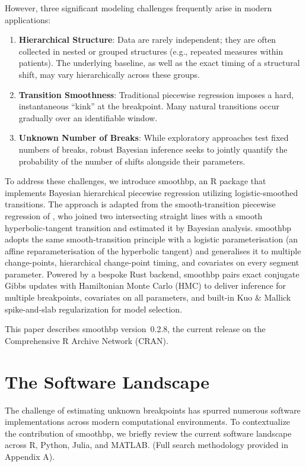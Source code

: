 \documentclass[12pt]{article}
\newcommand{\pkg}[1]{\textsf{#1}}
\begin{document}
However, three significant modeling challenges frequently arise in modern applications:
\begin{enumerate}
    \item \textbf{Hierarchical Structure}: Data are rarely independent; they are often collected in nested or grouped structures (e.g., repeated measures within patients). The underlying baseline, as well as the exact timing of a structural shift, may vary hierarchically across these groups.
    \item \textbf{Transition Smoothness}: Traditional piecewise regression imposes a hard, instantaneous ``kink'' at the breakpoint. Many natural transitions occur gradually over an identifiable window.
    \item \textbf{Unknown Number of Breaks}: While exploratory approaches test fixed numbers of breaks, robust Bayesian inference seeks to jointly quantify the probability of the number of shifts alongside their parameters.
\end{enumerate}

To address these challenges, we introduce \pkg{smoothbp}, an R package that implements Bayesian hierarchical piecewise regression utilizing logistic-smoothed transitions. The approach is adapted from the smooth-transition piecewise regression of \citet{baconwatts1971}, who joined two intersecting straight lines with a smooth hyperbolic-tangent transition and estimated it by Bayesian analysis. \pkg{smoothbp} adopts the same smooth-transition principle with a logistic parameterisation (an affine reparameterisation of the hyperbolic tangent) and generalises it to multiple change-points, hierarchical change-point timing, and covariates on every segment parameter. Powered by a bespoke Rust backend, \pkg{smoothbp} pairs exact conjugate Gibbs updates with Hamiltonian Monte Carlo (HMC) to deliver inference for multiple breakpoints, covariates on all parameters, and built-in Kuo \& Mallick spike-and-slab regularization for model selection.

This paper describes \pkg{smoothbp} version~0.2.8, the current release on the Comprehensive R Archive Network (CRAN).

\section{The Software Landscape}

The challenge of estimating unknown breakpoints has spurred numerous software implementations across modern computational environments. To contextualize the contribution of \pkg{smoothbp}, we briefly review the current software landscape across R, Python, Julia, and MATLAB. (Full search methodology provided in Appendix A).
\end{document}
